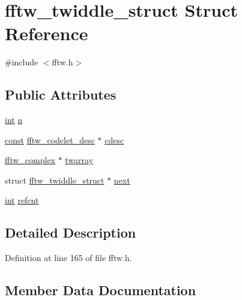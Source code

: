 \hypertarget{structfftw__twiddle__struct}{}\section{fftw\+\_\+twiddle\+\_\+struct Struct Reference}
\label{structfftw__twiddle__struct}


{\ttfamily \#include $<$fftw.\+h$>$}

\subsection*{Public Attributes}
\begin{DoxyCompactItemize}
\item 
\hyperlink{xmltok_8h_a5a0d4a5641ce434f1d23533f2b2e6653}{int} \hyperlink{structfftw__twiddle__struct_a1ef8adb93bb61bac933d4b59c8031087}{n}
\item 
\hyperlink{getopt1_8c_a2c212835823e3c54a8ab6d95c652660e}{const} \hyperlink{structfftw__codelet__desc}{fftw\+\_\+codelet\+\_\+desc} $\ast$ \hyperlink{structfftw__twiddle__struct_a54bdb5f494d6265576fbcedc9b8bc513}{cdesc}
\item 
\hyperlink{structfftw__complex}{fftw\+\_\+complex} $\ast$ \hyperlink{structfftw__twiddle__struct_ac9d49fa830d0e0e59de456bb4a614fe4}{twarray}
\item 
struct \hyperlink{structfftw__twiddle__struct}{fftw\+\_\+twiddle\+\_\+struct} $\ast$ \hyperlink{structfftw__twiddle__struct_a6bb8fd55d4b24190d2899f753ef94eaf}{next}
\item 
\hyperlink{xmltok_8h_a5a0d4a5641ce434f1d23533f2b2e6653}{int} \hyperlink{structfftw__twiddle__struct_ab6c2135b5ccb5c2941b0e48eeb10cd08}{refcnt}
\end{DoxyCompactItemize}


\subsection{Detailed Description}


Definition at line 165 of file fftw.\+h.



\subsection{Member Data Documentation}
